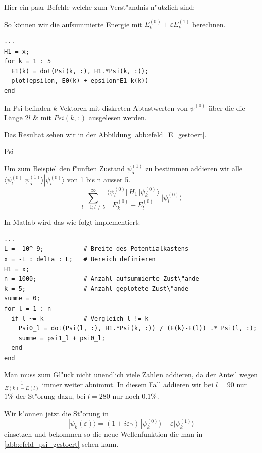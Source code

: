 \begin{refsection}
Hier ein paar Befehle welche zum Verst"andnis n"utzlich sind:





So k\"onnen wir die aufsummierte Energie mit $E_k^{(0)} + \varepsilon E_k^{(1)}$ berechnen.

\begin{lstlisting}[style=Matlab]
...
H1 = x;
for k = 1 : 5
  E1(k) = dot(Psi(k, :), H1.*Psi(k, :));
  plot(epsilon, E0(k) + epsilon*E1_k(k))
end
\end{lstlisting}
In Psi befinden $k$ Vektoren mit diskreten Abtastwerten von $\psi^{(0)}$ \"uber die die L\"ange $2l$
\& mit $Psi(k, :)$ ausgelesen werden.

Das Resultat sehen wir in der Abbildung \ref{abb:efeld_E_gestoert}.

Psi

Um zum Beispiel den f"unften Zustand $\psi_5^{(1)}$ zu bestimmen addieren wir alle 
$\langle\psi_l^{(0)}|\psi_5^{(1)}\rangle|\psi_l^{(0)}\rangle$
 von 1 bis n ausser 5.
\begin{equation}
  \sum_{l=1 ; l\ne 5}^{\infty}
    \frac{\langle \psi_l^{(0)}|\, H_1 \,|\psi_k^{(0)}\rangle}{E_k^{(0)}-E_l^{(0)}}
        \,
    |\psi_l^{(0)}\rangle
\end{equation}

In Matlab wird das wie folgt implementiert:
\begin{lstlisting}[style=Matlab]
...
L = -10^-9;           # Breite des Potentialkastens
x = -L : delta : L;   # Bereich definieren
H1 = x;               
n = 1000;             # Anzahl aufsummierte Zust\"ande
k = 5;                # Anzahl geplotete Zust\"ande
summe = 0;
for l = 1 : n
  if l ~= k           # Vergleich l != k
    Psi0_l = dot(Psi(l, :), H1.*Psi(k, :)) / (E(k)-E(l)) .* Psi(l, :);
    summe = psi1_l + psi0_l;
  end
end
\end{lstlisting} %

Man muss zum Gl"uck nicht unendlich viele Zahlen addieren, da der Anteil wegen $\frac{1}{E(k)-E(l)}$ immer weiter abnimmt.
In diesem Fall addieren wir bei $l=90$ nur $1\%$ der St"orung dazu, bei $l=280$ nur noch $0.1\%$.

Wir k"onnen jetzt die St"orung in 
\begin{equation}
|\psi_k(\varepsilon)\rangle
=
(1+i\varepsilon \gamma)
\,|\psi_k^{(0)}\rangle
+
\varepsilon|\psi_k^{(1)}\rangle
\end{equation}
einsetzen und bekommen so die neue Wellenfunktion die man in \ref{abb:efeld_psi_gestoert} sehen kann.



















\end{refsection}

